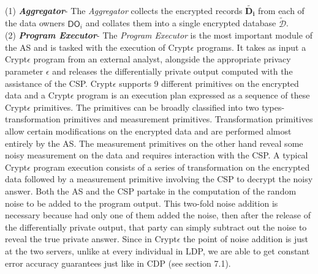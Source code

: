 \\
(1)\textbf{ \textit{ Aggregator}}- The \textit{Aggregator} collects the encrypted records $\mathbf{\tilde{D_i}}$ from each of the data owners $\textsf{DO}_i$ and collates them into a single encrypted database $\boldsymbol{\tilde{\mathcal{D}}}$. %
\\(2)\textbf{ \textit{Program Executor}}- The \textit{Program Executor} is the most important module of the \textsf{AS} and is tasked with the execution of Crypt$\epsilon$ programs. It takes as input a Crypt$\epsilon$ program from an external analyst, alongside the appropriate privacy parameter $\epsilon$ and releases the differentially private output computed with the assistance of the \textsf{CSP}. Crypt$\epsilon$ supports 9 different primitives on the encrypted data and a Crypt$\epsilon$ program is an execution plan expressed as a sequence of these Crypt$\epsilon$ primitives. The primitives can be broadly classified into two types- transformation primitives and measurement primitives. Transformation primitives allow certain modifications on the encrypted data and are performed almost entirely by the \textsf{AS}. The measurement primitives on the other hand reveal some noisy measurement on the data and requires interaction with the \textsf{CSP}. A typical Crypt$\epsilon$ program execution consists of  a series of transformation on the encrypted data followed by a measurement primitive involving the \textsf{CSP} to decrypt the noisy answer. Both the \textsf{AS} and the \textsf{CSP} partake in the computation of the random noise to be added to the program output. This two-fold noise addition is necessary because  had only one of them added the noise, then after the release of the differentially private output, that party can simply subtract out the noise to reveal the true private answer. Since in Crypt$\epsilon$ the point of noise addition is just at the two servers, unlike at every individual in \textsf{LDP}, we are able to get constant error accuracy guarantees just like in \textsf{CDP} (see section 7.1). 
